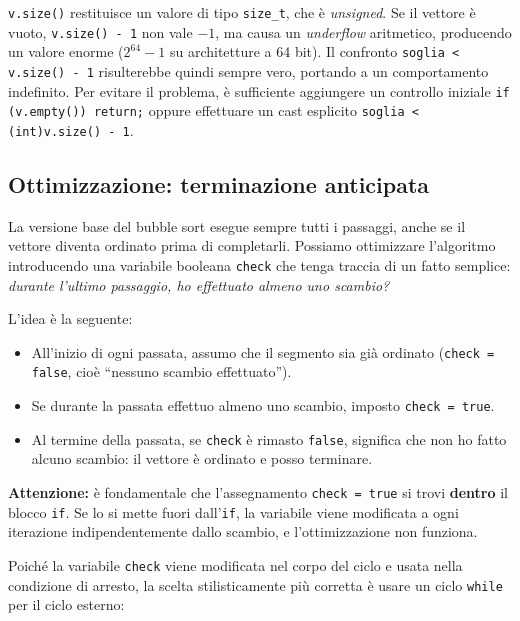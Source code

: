\begin{tcolorbox}[
    colback=orange!10!white,
    colframe=orange!60!black,
    boxrule=0.5pt,
    sharp corners,
    left=5mm, right=5mm,
    top=3mm, bottom=3mm,
    title=\textbf{Attenzione a \texttt{size\_t}}
]
\lstinline{v.size()} restituisce un valore di tipo \lstinline{size_t}, che \`e \textit{unsigned}. Se il vettore \`e vuoto, \lstinline{v.size() - 1} non vale $-1$, ma causa un \textit{underflow} aritmetico, producendo un valore enorme ($2^{64}-1$ su architetture a 64 bit). Il confronto \lstinline{soglia < v.size() - 1} risulterebbe quindi sempre vero, portando a un comportamento indefinito. Per evitare il problema, \`e sufficiente aggiungere un controllo iniziale \lstinline{if (v.empty()) return;} oppure effettuare un cast esplicito \lstinline{soglia < (int)v.size() - 1}.
\end{tcolorbox}

\subsection*{Ottimizzazione: terminazione anticipata}

La versione base del bubble sort esegue sempre tutti i passaggi, anche se il vettore diventa ordinato prima di completarli. Possiamo ottimizzare l'algoritmo introducendo una variabile booleana \lstinline{check} che tenga traccia di un fatto semplice: \textit{durante l'ultimo passaggio, ho effettuato almeno uno scambio?}

L'idea \`e la seguente:
\begin{itemize}
    \item All'inizio di ogni passata, assumo che il segmento sia gi\`a ordinato (\lstinline{check = false}, cio\`e ``nessuno scambio effettuato'').
    \item Se durante la passata effettuo almeno uno scambio, imposto \lstinline{check = true}.
    \item Al termine della passata, se \lstinline{check} \`e rimasto \lstinline{false}, significa che non ho fatto alcuno scambio: il vettore \`e ordinato e posso terminare.
\end{itemize}

\textbf{Attenzione:} \`e fondamentale che l'assegnamento \lstinline{check = true} si trovi \textbf{dentro} il blocco \lstinline{if}. Se lo si mette fuori dall'\lstinline{if}, la variabile viene modificata a ogni iterazione indipendentemente dallo scambio, e l'ottimizzazione non funziona.

Poich\'e la variabile \lstinline{check} viene modificata nel corpo del ciclo e usata nella condizione di arresto, la scelta stilisticamente pi\`u corretta \`e usare un ciclo \lstinline{while} per il ciclo esterno:

